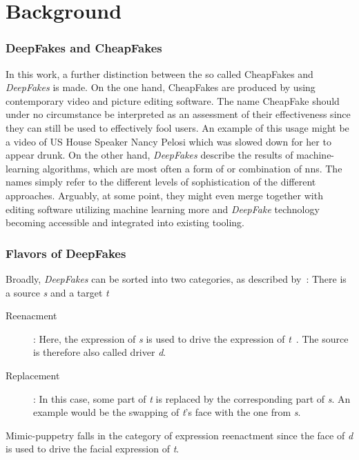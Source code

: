 \section{Background}\label{sect:background}

\subsubsection{DeepFakes and CheapFakes}
In this work, a further distinction between the so called CheapFakes and \textit{DeepFakes}
is made. On the one hand, CheapFakes are produced by using contemporary video 
and picture editing software. The name CheapFake should under no circumstance be
interpreted as an assessment of their effectiveness since they can still be used
to effectively fool users. An example of this usage might be a video of US House
Speaker Nancy Pelosi which was slowed down for her to appear drunk.
On the other hand, \textit{DeepFakes} describe the results of machine-learning
algorithms, which are most often a form of or combination of \glspl{nn}.
The names simply refer to the different levels of sophistication of the different
approaches. Arguably, at some point, they might even merge together with editing 
software utilizing machine learning more and \textit{DeepFake} technology becoming
accessible and integrated into existing tooling.

\subsubsection{Flavors of DeepFakes}\label{subsubsect:deepfake-flavors}
Broadly, \textit{DeepFakes} can be sorted into two categories, as described by~\textcite{mirsky_creation_2020}:
There is a source \textit{s} and a target \textit{t}

\begin{description}
    \item[Reenacment]: Here, the expression of \textit{s} is used to drive
    the expression of \textit{t}~\cite{mirsky_creation_2020}. The source is
    therefore also called driver \textit{d}.
    \item[Replacement]: In this case, some part of \textit{t} is replaced
    by the corresponding part of \textit{s}. An example would be the swapping of
    \textit{t}'s face with the one from \textit{s}.
\end{description}

Mimic-puppetry falls in the category of expression reenactment since the face of
\textit{d} is used to drive the facial expression of \textit{t}.


